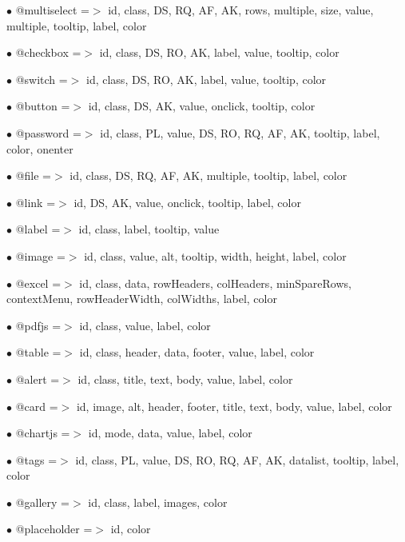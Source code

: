 \documentclass[a4paper]{book}
\begin{document}
\begin{compactitem}
\item[\color{myblue}$\bullet$] @multiselect =$>$ id, class, DS, RQ, AF, AK, rows, multiple, size, value, multiple, tooltip, label, color
\item[\color{myblue}$\bullet$] @checkbox    =$>$ id, class, DS, RO, AK, label, value, tooltip, color
\item[\color{myblue}$\bullet$] @switch      =$>$ id, class, DS, RO, AK, label, value, tooltip, color
\item[\color{myblue}$\bullet$] @button      =$>$ id, class, DS, AK, value, onclick, tooltip, color
\item[\color{myblue}$\bullet$] @password    =$>$ id, class, PL, value, DS, RO, RQ, AF, AK, tooltip, label, color, onenter
\item[\color{myblue}$\bullet$] @file        =$>$ id, class, DS, RQ, AF, AK, multiple, tooltip, label, color
\item[\color{myblue}$\bullet$] @link        =$>$ id, DS, AK, value, onclick, tooltip, label, color
\item[\color{myblue}$\bullet$] @label       =$>$ id, class, label, tooltip, value
\item[\color{myblue}$\bullet$] @image       =$>$ id, class, value, alt, tooltip, width, height, label, color
\item[\color{myblue}$\bullet$] @excel       =$>$ id, class, data, rowHeaders, colHeaders, minSpareRows, contextMenu, rowHeaderWidth,
                colWidths, label, color
\item[\color{myblue}$\bullet$] @pdfjs       =$>$ id, class, value, label, color
\item[\color{myblue}$\bullet$] @table       =$>$ id, class, header, data, footer, value, label, color
\item[\color{myblue}$\bullet$] @alert       =$>$ id, class, title, text, body, value, label, color
\item[\color{myblue}$\bullet$] @card        =$>$ id, image, alt, header, footer, title, text, body, value, label, color
\item[\color{myblue}$\bullet$] @chartjs     =$>$ id, mode, data, value, label, color
\item[\color{myblue}$\bullet$] @tags        =$>$ id, class, PL, value, DS, RO, RQ, AF, AK, datalist, tooltip, label, color
\item[\color{myblue}$\bullet$] @gallery     =$>$ id, class, label, images, color
\item[\color{myblue}$\bullet$] @placeholder =$>$ id, color
\end{compactitem}
\end{document}
